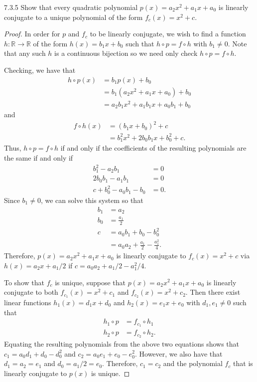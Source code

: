 \begin{problem}{7.3.5}
  Show that every quadratic polynomial $p(x) = a_2 x^2 + a_1 x + a_0$ is linearly conjugate
  to a unique polynomial of the form $f_c(x) = x^2 + c$.
\end{problem}

\begin{proof}
  In order for $p$ and $f_c$ to be linearly conjugate, we wish to find a function
  $h: \mathbb{R} \to \mathbb{R}$ of the form $h(x) = b_1 x + b_0$ such that $h \circ p = f \circ h$ with $b_1 \neq 0$.
  Note that any such $h$ is a continuous bijection so we need only check $h \circ p = f \circ h$.

  Checking, we have that
  \begin{align*}
    h \circ p (x) &= b_1 p(x) + b_0 \\
    &= b_1(a_2 x^2 + a_1 x + a_0) + b_0 \\
    &= a_2b_1 x^2 + a_1b_1 x + a_0b_1 + b_0
  \end{align*}
  and
  \begin{align*}
    f \circ h(x) &= \left(b_1 x + b_0\right)^2 + c \\
    &= b_1^2 x^2 + 2b_0 b_1 x + b_0^2 + c.
  \end{align*}
  Thus, $h\circ p = f \circ h$ if and only if the coefficients of the resulting
  polynomials are the same if and only if
  \begin{align*}
    b_1^2 - a_2b_1 &= 0 \\
    2b_0 b_1 - a_1b_1 &= 0 \\
    c + b_0^2 - a_0b_1 - b_0 &= 0.
  \end{align*}
  Since $b_1 \neq 0$, we can solve this system so that
  \begin{align*}
    b_1 &= a_2 \\
    b_0 &= \frac{a_1}{2} \\
    c &= a_0b_1 + b_0 - b_0^2 \\
    &= a_0a_2 + \frac{a_1}{2} - \frac{a_1^2}{4}.
  \end{align*}
  Therefore, $p(x) = a_2 x^2 + a_1 x + a_0$ is linearly conjugate to
  $f_c(x) = x^2 + c$
  via $h(x) = a_2 x + a_1 /2$ if $c = a_0a_2 + a_1/2 - a_1^2/4$.

  To show that $f_c$ is unique, suppose that $p(x) = a_2 x^2 + a_1 x + a_0$
  is linearly conjugate to both $f_{c_1}(x) = x^2 + c_1$ and $f_{c_2}(x) = x^2 + c_2$.
  Then there exist linear functions $h_1(x) = d_1 x + d_0$ and $h_2(x) = e_1 x + e_0$
  with $d_1, e_1 \neq 0$
  such that
  \begin{align*}
    h_1 \circ p &= f_{c_1} \circ h_1\\
    h_2 \circ p &= f_{c_2} \circ h_2.
  \end{align*}
  Equating the resulting polynomials from the above two equations shows that
  $c_1 = a_0d_1 + d_0 - d_0^2$ and $c_2 = a_0e_1 + e_0 - e_0^2$. However, we also have
  that $d_1 = a_2 = e_1$ and $d_0 = a_1/2 = e_0$. Therefore, $c_1 = c_2$ and the polynomial $f_c$ that is
  linearly conjugate to $p(x)$ is unique.
\end{proof}
\newpage
